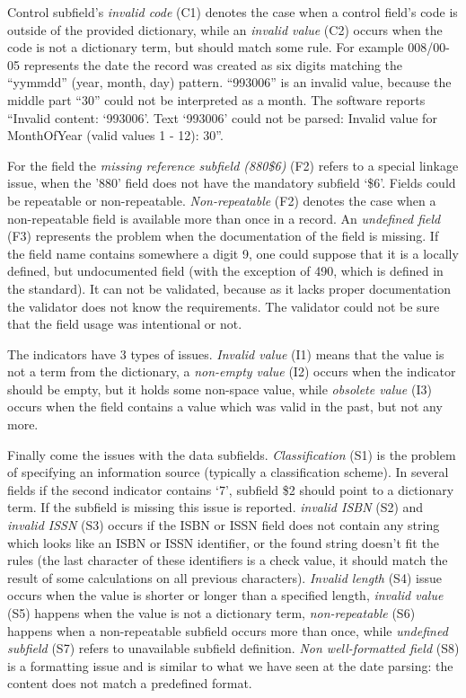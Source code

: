 Control subfield's \emph{invalid code} (C1) denotes the case when a control field's code is outside of the provided dictionary, while an \emph{invalid value} (C2) occurs when the code is not a dictionary term, but should match some rule. For example 008/00-05 represents the date the record was created as six digits matching the ``yymmdd'' (year, month, day) pattern. ``993006'' is an invalid value, because the middle part ``30'' could not be interpreted as a month. The software reports ``Invalid content: `993006'. Text `993006' could not be parsed: Invalid value for MonthOfYear (valid values 1 - 12): 30''.

For the field the \emph{missing reference subfield (880\$6)} (F2) refers to a special linkage issue, when the '880' field does not have the mandatory subfield `\$6'. Fields could be repeatable or non-repeatable. \emph{Non-repeatable} (F2) denotes the case when a non-repeatable field is available more than once in a record. An \emph{undefined field} (F3) represents the problem when the documentation of the field is missing. If the field name contains somewhere a digit 9, one could suppose that it is a locally defined, but undocumented field (with the exception of 490, which is defined in the standard). It can not be validated, because as it lacks proper documentation the validator does not know the requirements. The validator could not be sure that the field usage was intentional or not.

The indicators have 3 types of issues. \emph{Invalid value} (I1) means that the value is not a term from the dictionary, a \emph{non-empty value} (I2) occurs when the indicator should be empty, but it holds some non-space value, while \emph{obsolete value} (I3) occurs when the field contains a value which was valid in the past, but not any more.

Finally come the issues with the data subfields. \emph{Classification} (S1) is the problem of specifying an information source (typically a classification scheme). In several fields if the second indicator contains `7', subfield \$2 should point to a dictionary term. If the subfield is missing this issue is reported. \emph{invalid ISBN} (S2) and \emph{invalid ISSN} (S3) occurs if the ISBN or ISSN field does not contain any string which looks like an ISBN or ISSN identifier, or the found string doesn't fit the rules (the last character of these identifiers is a check value, it should match the result of some calculations on all previous characters). \emph{Invalid length} (S4) issue occurs when the value is shorter or longer than a specified length, \emph{invalid value} (S5) happens when the value is not a dictionary term, \emph{non-repeatable} (S6) happens when a non-repeatable subfield occurs more than once, while \emph{undefined subfield} (S7) refers to unavailable subfield definition. \emph{Non well-formatted field} (S8) is a formatting issue and is similar to what we have seen at the date parsing: the content does not match a predefined format. 

